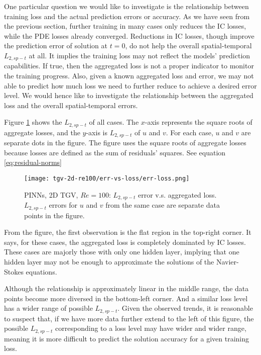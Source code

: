 One particular question we would like to investigate is the relationship between training loss and the actual prediction errors or accuracy.
As we have seen from the previous section, further training in many cases only reduces the IC losses, while the PDE losses already converged.
Reductions in IC losses, though improve the prediction error of solution at $t=0$, do not help the overall spatial-temporal $L_{2,sp-t}$ at all.
It implies the training loss may not reflect the models' prediction capabilities.
If true, then the aggregated loss is not a proper indicator to monitor the training progress.
Also, given a known aggregated loss and error, we may not able to predict how much loss we need to further reduce to achieve a desired error level.
We would hence like to investigate the relationship between the aggregated loss and the overall spatial-temporal errors.

Figure \ref{fig:tgv2d-re100-err-vs-loss} shows the $L_{2,sp-t}$ of all cases.
The $x$-axis represents the square roots of aggregate losses, and the $y$-axis is $L_{2,sp-t}$ of $u$ and $v$.
For each case, $u$ and $v$ are separate dots in the figure.
The figure uses the square roots of aggregate losses because losses are defined as the sum of residuals' squares.
See equation \eqref{eq:residual-norms}

\begin{figure}[hbt!]
    \centering%
    \texttt{[image: tgv-2d-re100/err-vs-loss/err-loss.png]}
    \caption[%
        PINNs, 2D TGV, $Re=100$: $L_{2,sp-t}$ error v.s. aggregated loss%
    ]{%
        PINNs, 2D TGV, $Re=100$: $L_{2,sp-t}$ error v.s. aggregated loss.%
        $L_{2,sp-t}$ errors for $u$ and $v$ from the same case are separate data points in the figure.
    }
    \label{fig:tgv2d-re100-err-vs-loss}
\end{figure}

From the figure, the first observation is the flat region in the top-right corner.
It says, for these cases, the aggregated loss is completely dominated by IC losses.
These cases are majorly those with only one hidden layer, implying that one hidden layer may not be enough to approximate the solutions of the Navier-Stokes equations.

Although the relationship is approximately linear in the middle range, the data points become more diversed in the bottom-left corner.
And a similar loss level has a wider range of possible $L_{2,sp-t}$.
Given the observed trends, it is reasonable to suspect that, if we have more data further extend to the left of this figure, the possible $L_{2,sp-t}$ corresponding to a loss level may have wider and wider range, meaning it is more difficult to predict the solution accuracy for a given training loss.

